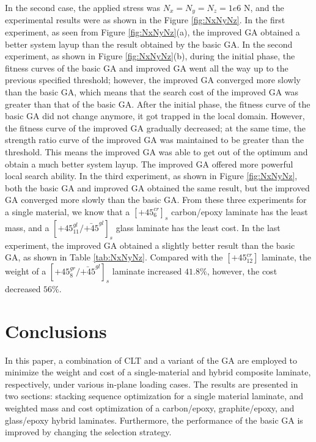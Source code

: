 \documentclass[USenglish,twocolumn]{article}
\begin{document}
In the second case, the applied stress was $N_x=N_y=N_z=1e6$ N, and the experimental results were as
shown in the Figure \ref{fig:NxNyNz}. In the first experiment, as seen from Figure \ref{fig:NxNyNz}(a), the improved GA obtained a
better system layup than the result obtained by the basic GA. In the second experiment, as shown in Figure \ref{fig:NxNyNz}(b), during
the initial phase, the fitness curves of the basic GA and improved GA went all the way up to the
previous specified threshold; however, the improved GA converged more slowly than the basic GA, which
means that the search cost of the improved GA was greater than that of the basic GA. After the initial phase, the fitness
curve of the basic GA did not change anymore, it got trapped in the local domain.%
 However, the fitness curve of the
improved GA gradually decreased; at the same time, the strength ratio curve of the improved GA
was maintained to be greater than the threshold. This means the improved GA was able to get out of the optimum
and obtain a much better system layup. The improved GA offered more powerful local search
ability. In the third experiment, as shown in Figure \ref{fig:NxNyNz}, both the basic GA and improved
GA obtained the same result, but the improved GA converged more slowly than the basic GA. From these
three experiments for a single material, we know that a $[\text{+}45_{6}^{cr}]_s$ carbon/epoxy laminate has
the least mass, and a $[\text{+}45_{11}^{gl}/\bar{\text{+}45}^{gl}]_s$ glass laminate has the least
cost. In the last experiment, the improved GA obtained a slightly better result than the basic GA,
as shown in Table \ref{tab:NxNyNz}. Compared with the $[\text{+}45_{12}^{cr}]$ laminate, the
weight of a $[\text{+}45_8^{gr}/\bar{\text{+}45}^{gl}]_s$ laminate increased $41.8\%$, however, the
cost decreased $56\%$.


\section{Conclusions}
In this paper, a combination of CLT and a variant of the GA are employed to minimize the weight and cost
of a single-material and hybrid composite laminate, respectively, under various in-plane loading
cases. The results are presented in two sections: stacking sequence optimization for a single material
laminate, and weighted mass and cost optimization of a carbon/epoxy, graphite/epoxy, and
glass/epoxy hybrid laminates. Furthermore, the performance of the basic GA is improved by changing the
selection strategy.
\end{document}

